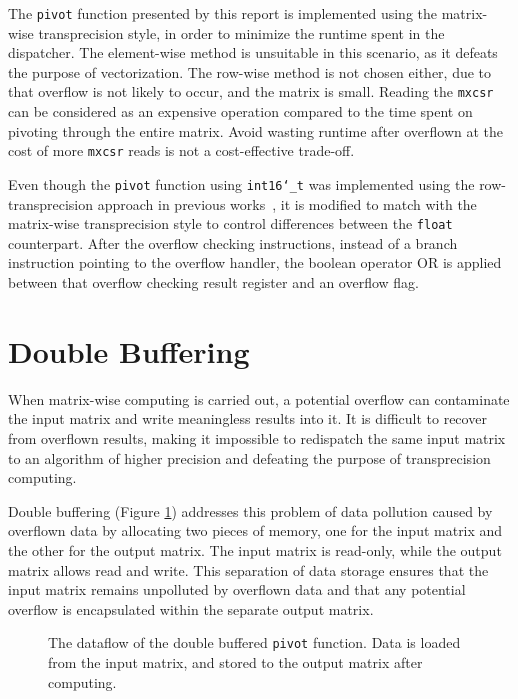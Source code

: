 \documentclass[logo,bsc,singlespacing,parskip]{infthesis}
\newcommand{\dtshort}{\texttt{int16\char`_t}}
\newcommand{\dtfloat}{\texttt{float}}
\newcommand{\mxcsr}{\texttt{mxcsr}}
\newcommand{\pivot}{\texttt{pivot}}
\begin{document}
The \pivot{} function presented by this report is implemented using the
matrix-wise transprecision style, in order to minimize the runtime spent in the
dispatcher. The element-wise method is unsuitable in this scenario, as it
defeats the purpose of vectorization. The row-wise method is not chosen either,
due to that overflow is not likely to occur, and the matrix is small. Reading
the \mxcsr{} can be considered as an expensive operation compared to the time
spent on pivoting through the entire matrix. Avoid wasting runtime after
overflown at the cost of more \mxcsr{} reads is not a cost-effective
trade-off.

Even though the \pivot{} function using \dtshort{} was implemented using the
row-transprecision approach in previous works~\cite{FPL2}, it is modified to
match with the matrix-wise transprecision style to control differences
between the \dtfloat{} counterpart. After the overflow checking instructions,
instead of a branch instruction pointing to the overflow handler, the boolean
operator OR is applied between that overflow checking result register and an
overflow flag. 


\section{Double Buffering}

When matrix-wise computing is carried out, a potential overflow can contaminate
the input matrix and write meaningless results into it. It is difficult to
recover from overflown results, making it impossible to redispatch the same
input matrix to an algorithm of higher precision and defeating the purpose of
transprecision computing.

Double buffering (Figure \ref{fig:double-buffering}) 
addresses this problem of data pollution
caused by overflown data by allocating two pieces of
memory, one for the input matrix and the other for the output matrix. The input
matrix is read-only, while the output matrix allows read and write.
This separation of data storage ensures that the input matrix remains unpolluted
by overflown data and that any potential overflow is encapsulated within the
separate output matrix. 
\begin{figure}[H]
\centering
{}
\caption{The dataflow of the double buffered \pivot{}
function. Data is loaded from the input matrix, and stored to the output
matrix after computing.}
\label{fig:double-buffering}
\end{figure}
\end{document}

